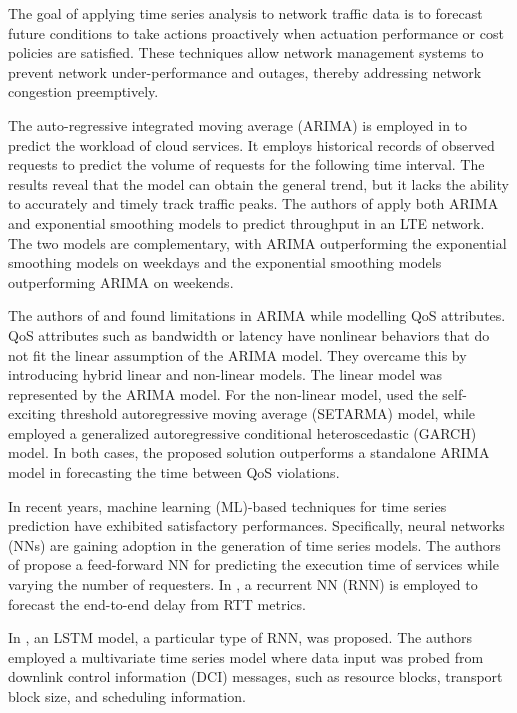 The goal of applying time series analysis to network traffic data is to forecast future conditions to take actions proactively when actuation performance or cost policies are satisfied. These techniques allow network management systems to prevent network under-performance and outages, thereby addressing network congestion preemptively.

The auto-regressive integrated moving average (ARIMA) is employed in \cite{calheiros2014} to predict the workload of cloud services. It employs historical records of observed requests to predict the volume of requests for the following time interval. The results reveal that the model can obtain the general trend, but it lacks the ability to accurately and timely track traffic peaks. The authors of \cite{dong2015} apply both ARIMA and exponential smoothing models to predict throughput in an LTE network. The two models are complementary, with ARIMA outperforming the exponential smoothing models on weekdays and the exponential smoothing models outperforming ARIMA on weekends.

The authors of \cite{amin2012} and \cite{amin2012-2} found limitations in ARIMA while modelling QoS attributes. QoS attributes such as bandwidth or latency have nonlinear behaviors that do not fit the linear assumption of the ARIMA model. They overcame this by introducing hybrid linear and non-linear models. The linear model was represented by the ARIMA model. For the non-linear model, \cite{amin2012} used the self-exciting threshold autoregressive moving average (SETARMA) model, while \cite{amin2012-2} employed a generalized autoregressive conditional heteroscedastic (GARCH) model. In both cases, the proposed solution outperforms a standalone ARIMA model in forecasting the time between QoS violations.

In recent years, machine learning (ML)-based techniques for time series prediction have exhibited satisfactory performances. Specifically, neural networks (NNs) are gaining adoption in the generation of time series models. The authors of \cite{zadeh2010} propose a feed-forward NN for predicting the execution time of services while varying the number of requesters. In \cite{belhaj2009}, a recurrent NN (RNN) is employed to forecast the end-to-end delay from RTT metrics.

In \cite{trinh2018}, an LSTM model, a particular type of RNN, was proposed. The authors employed a multivariate time series model where data input was probed from downlink control information (DCI) messages, such as resource blocks, transport block size, and scheduling information.

